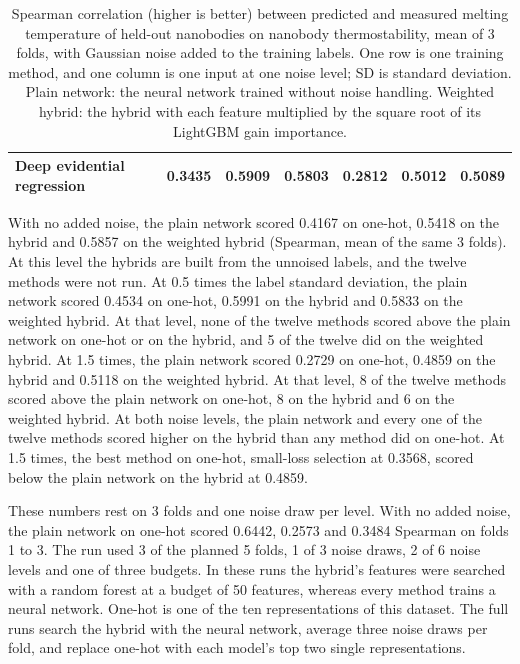 \begin{table}[htbp]
\begin{tabular}{@{}lcccccc@{}}
Deep evidential regression & 0.3435 & 0.5909 & 0.5803 & 0.2812 & 0.5012 & 0.5089 \\
\bottomrule
\end{tabular}
\caption[Methods for LNL on nanobody thermostability]{Spearman correlation (higher is better) between predicted and measured melting temperature of held-out nanobodies on nanobody thermostability, mean of 3 folds, with Gaussian noise added to the training labels. One row is one training method, and one column is one input at one noise level; SD is standard deviation. Plain network: the neural network trained without noise handling. Weighted hybrid: the hybrid with each feature multiplied by the square root of its LightGBM gain importance.}
\label{tab:ch6prelim_lnl}
\end{table}

With no added noise, the plain network scored 0.4167 on one-hot, 0.5418 on the hybrid and 0.5857 on the weighted hybrid (Spearman, mean of the same 3 folds). At this level the hybrids are built from the unnoised labels, and the twelve methods were not run. At 0.5 times the label standard deviation, the plain network scored 0.4534 on one-hot, 0.5991 on the hybrid and 0.5833 on the weighted hybrid. At that level, none of the twelve methods scored above the plain network on one-hot or on the hybrid, and 5 of the twelve did on the weighted hybrid. At 1.5 times, the plain network scored 0.2729 on one-hot, 0.4859 on the hybrid and 0.5118 on the weighted hybrid. At that level, 8 of the twelve methods scored above the plain network on one-hot, 8 on the hybrid and 6 on the weighted hybrid. At both noise levels, the plain network and every one of the twelve methods scored higher on the hybrid than any method did on one-hot. At 1.5 times, the best method on one-hot, small-loss selection at 0.3568, scored below the plain network on the hybrid at 0.4859.

These numbers rest on 3 folds and one noise draw per level. With no added noise, the plain network on one-hot scored 0.6442, 0.2573 and 0.3484 Spearman on folds 1 to 3. The run used 3 of the planned 5 folds, 1 of 3 noise draws, 2 of 6 noise levels and one of three budgets. In these runs the hybrid's features were searched with a random forest at a budget of 50 features, whereas every method trains a neural network. One-hot is one of the ten representations of this dataset. The full runs search the hybrid with the neural network, average three noise draws per fold, and replace one-hot with each model's top two single representations.


